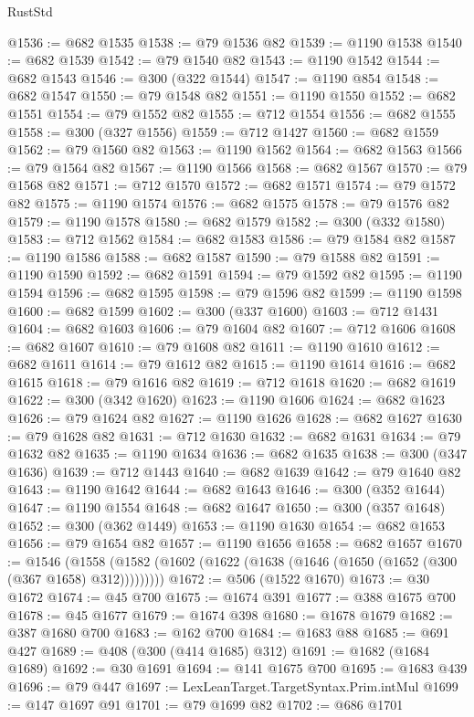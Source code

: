 \begin{lexlean}{RustStd}
\begin{coremodule}
@1536 := @682 @1535
@1538 := @79 @1536 @82
@1539 := @1190 @1538
@1540 := @682 @1539
@1542 := @79 @1540 @82
@1543 := @1190 @1542
@1544 := @682 @1543
@1546 := @300 (@322 @1544)
@1547 := @1190 @854
@1548 := @682 @1547
@1550 := @79 @1548 @82
@1551 := @1190 @1550
@1552 := @682 @1551
@1554 := @79 @1552 @82
@1555 := @712 @1554
@1556 := @682 @1555
@1558 := @300 (@327 @1556)
@1559 := @712 @1427
@1560 := @682 @1559
@1562 := @79 @1560 @82
@1563 := @1190 @1562
@1564 := @682 @1563
@1566 := @79 @1564 @82
@1567 := @1190 @1566
@1568 := @682 @1567
@1570 := @79 @1568 @82
@1571 := @712 @1570
@1572 := @682 @1571
@1574 := @79 @1572 @82
@1575 := @1190 @1574
@1576 := @682 @1575
@1578 := @79 @1576 @82
@1579 := @1190 @1578
@1580 := @682 @1579
@1582 := @300 (@332 @1580)
@1583 := @712 @1562
@1584 := @682 @1583
@1586 := @79 @1584 @82
@1587 := @1190 @1586
@1588 := @682 @1587
@1590 := @79 @1588 @82
@1591 := @1190 @1590
@1592 := @682 @1591
@1594 := @79 @1592 @82
@1595 := @1190 @1594
@1596 := @682 @1595
@1598 := @79 @1596 @82
@1599 := @1190 @1598
@1600 := @682 @1599
@1602 := @300 (@337 @1600)
@1603 := @712 @1431
@1604 := @682 @1603
@1606 := @79 @1604 @82
@1607 := @712 @1606
@1608 := @682 @1607
@1610 := @79 @1608 @82
@1611 := @1190 @1610
@1612 := @682 @1611
@1614 := @79 @1612 @82
@1615 := @1190 @1614
@1616 := @682 @1615
@1618 := @79 @1616 @82
@1619 := @712 @1618
@1620 := @682 @1619
@1622 := @300 (@342 @1620)
@1623 := @1190 @1606
@1624 := @682 @1623
@1626 := @79 @1624 @82
@1627 := @1190 @1626
@1628 := @682 @1627
@1630 := @79 @1628 @82
@1631 := @712 @1630
@1632 := @682 @1631
@1634 := @79 @1632 @82
@1635 := @1190 @1634
@1636 := @682 @1635
@1638 := @300 (@347 @1636)
@1639 := @712 @1443
@1640 := @682 @1639
@1642 := @79 @1640 @82
@1643 := @1190 @1642
@1644 := @682 @1643
@1646 := @300 (@352 @1644)
@1647 := @1190 @1554
@1648 := @682 @1647
@1650 := @300 (@357 @1648)
@1652 := @300 (@362 @1449)
@1653 := @1190 @1630
@1654 := @682 @1653
@1656 := @79 @1654 @82
@1657 := @1190 @1656
@1658 := @682 @1657
@1670 := @1546
    (@1558 (@1582 (@1602 (@1622 (@1638 (@1646 (@1650 (@1652 (@300 (@367 @1658) @312)))))))))
@1672 := @506 (@1522 @1670)
@1673 := @30 @1672
@1674 := @45 @700
@1675 := @1674 @391
@1677 := @388 @1675 @700
@1678 := @45 @1677
@1679 := @1674 @398
@1680 := @1678 @1679
@1682 := @387 @1680 @700
@1683 := @162 @700
@1684 := @1683 @88
@1685 := @691 @427
@1689 := @408 (@300 (@414 @1685) @312)
@1691 := @1682 (@1684 @1689)
@1692 := @30 @1691
@1694 := @141 @1675 @700
@1695 := @1683 @439
@1696 := @79 @447
@1697 := LexLeanTarget.TargetSyntax.Prim.intMul
@1699 := @147 @1697 @91
@1701 := @79 @1699 @82
@1702 := @686 @1701

\end{coremodule}
\end{lexlean}
